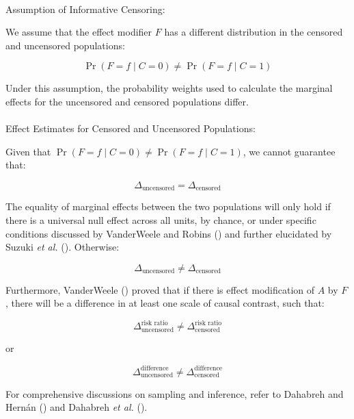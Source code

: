 \documentclass[
  single column]{article}
\makeatletter
\let\oldparagraph\paragraph
\renewcommand{\paragraph}{
    \@ifstar
      \xxxParagraphStar
      \xxxParagraphNoStar
  }
\newcommand{\xxxParagraphStar}[1]{\oldparagraph*{#1}\mbox{}}
\newcommand{\xxxParagraphNoStar}[1]{\oldparagraph{#1}\mbox{}}
\makeatother
\begin{document}
\paragraph{Assumption of Informative
Censoring:}\label{assumption-of-informative-censoring}

We assume that the effect modifier \(F\) has a different distribution in
the censored and uncensored populations:

\[
\Pr(F=f \mid C=0) \neq \Pr(F=f \mid C=1)
\]

Under this assumption, the probability weights used to calculate the
marginal effects for the uncensored and censored populations differ.

\paragraph{Effect Estimates for Censored and Uncensored
Populations:}\label{effect-estimates-for-censored-and-uncensored-populations}

Given that \(\Pr(F=f \mid C=0) \neq \Pr(F=f \mid C=1)\), we cannot
guarantee that:

\[
\Delta_{\text{uncensored}} = \Delta_{\text{censored}}
\]

The equality of marginal effects between the two populations will only
hold if there is a universal null effect across all units, by chance, or
under specific conditions discussed by VanderWeele and Robins
() and further elucidated by Suzuki
\emph{et al.} ().
Otherwise:

\[
\Delta_{\text{uncensored}} \ne \Delta_{\text{censored}}
\]

Furthermore, VanderWeele () proved
that if there is effect modification of \(A\) by \(F\), there will be a
difference in at least one scale of causal contrast, such that:

\[
\Delta^{\text{risk ratio}}_{\text{uncensored}} \ne \Delta^{\text{risk ratio}}_{\text{censored}}
\]

or

\[
\Delta^{\text{difference}}_{\text{uncensored}} \ne \Delta^{\text{difference}}_{\text{censored}}
\]

For comprehensive discussions on sampling and inference, refer to
Dahabreh and Hernán () and Dahabreh
\emph{et al.} ().

\newpage{}
\end{document}
